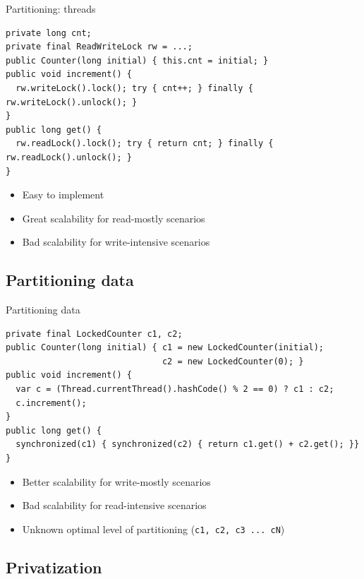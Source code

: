 \begin{frame}[fragile]{Partitioning: threads}

\begin{verbatim}
private long cnt; 
private final ReadWriteLock rw = ...;
public Counter(long initial) { this.cnt = initial; }
public void increment() { 
  rw.writeLock().lock(); try { cnt++; } finally { rw.writeLock().unlock(); } 
}
public long get() { 
  rw.readLock().lock(); try { return cnt; } finally { rw.readLock().unlock(); } 
}
\end{verbatim}

\pause

\begin{itemize}
    \item Easy to implement
    \item Great scalability for read-mostly scenarios
    \item Bad scalability for write-intensive scenarios
\end{itemize}
\end{frame}

\subsection{Partitioning data}
\showTOCSub

\begin{frame}[fragile]{Partitioning data}
\begin{verbatim}
private final LockedCounter c1, c2;
public Counter(long initial) { c1 = new LockedCounter(initial); 
                               c2 = new LockedCounter(0); }
public void increment() { 
  var c = (Thread.currentThread().hashCode() % 2 == 0) ? c1 : c2;
  c.increment();
}
public long get() { 
  synchronized(c1) { synchronized(c2) { return c1.get() + c2.get(); }}
}
\end{verbatim}

\pause

\begin{itemize}
    \item Better scalability for write-mostly scenarios
    \item Bad scalability for read-intensive scenarios
    \item Unknown optimal level of partitioning (\texttt{c1, c2, c3 ... cN})
\end{itemize}
\end{frame}

\subsection{Privatization}
\showTOCSub


